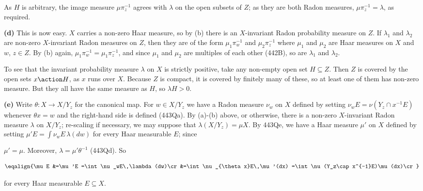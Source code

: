 {\noindent As $H$ is arbitrary, the image measure $\mu\pi_z^{-1}$ agrees
with $\lambda$ on the open subsets of $Z$;  as they are both Radon
measures, $\mu\pi_z^{-1}=\lambda$, as required.

\medskip

{\bf (d)} This is now easy.   $X$ carries a non-zero Haar measure, so by
(b) there is an $X$-invariant Radon probability measure on $Z$.
If $\lambda_1$ and $\lambda_2$ are non-zero $X$-invariant Radon measures
on $Z$, then they are of the form $\mu_1\pi_w^{-1}$ and
$\mu_2\pi_z^{-1}$ where $\mu_1$ and $\mu_2$ are Haar measures on $X$ and
$w$, $z\in Z$.
By (b) again, $\mu_1\pi_w^{-1}=\mu_1\pi_z^{-1}$, and since $\mu_1$ and
$\mu_2$ are multiples of each other (442B), so are $\lambda_1$ and
$\lambda_2$.

To see that the invariant probability measure $\lambda$ on $X$ is
strictly positive, take any non-empty open set $H\subseteq Z$.   Then
$Z$ is
covered by the open sets $x\action H$, as $x$ runs over $X$.
Because $Z$ is compact, it is covered by finitely many of these, so at
least one of them has non-zero measure.   But they all have the same
measure as $H$, so $\lambda H>0$.

\medskip

{\bf (e)} Write $\theta:X\to X/Y_z$ for the canonical map.   For
$w\in X/Y_z$ we have a Radon measure $\nu_w$ on $X$ defined by setting
$\nu_wE=\nu(Y_z\cap x^{-1}E)$ whenever $\theta x=w$ and the right-hand
side is defined (443Qa).   By (a)-(b) above, or otherwise, there is a
non-zero $X$-invariant Radon measure $\lambda$ on $X/Y_z$;  re-scaling
if necessary, we may suppose that $\lambda(X/Y_z)=\mu X$.   By 443Qe, we
have a Haar measure $\mu'$ on $X$ defined by setting
$\mu'E=\int\nu_wE\,\lambda(dw)$ for every Haar measurable $E$;  since


\noindent $\mu'=\mu$.   Moreover, $\lambda=\mu'\theta^{-1}$ (443Qd).
So

$$\eqalign{\mu E
&=\mu'E
=\int\nu_wE\,\lambda(dw)\cr
&=\int\nu_{\theta x}E\,\mu'(dx)
=\int\nu(Y_z\cap x^{-1}E)\mu(dx)\cr}$$

\noindent for every Haar measurable $E\subseteq X$.
}%

